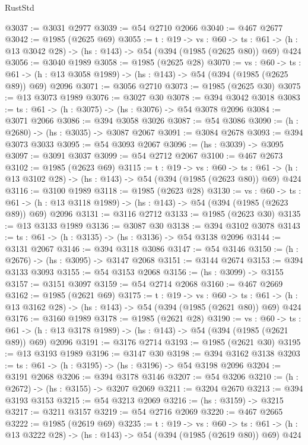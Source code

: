 \begin{lexlean}{RustStd}
\begin{coremodule}
{\begin{coremodule}
{{{{{{{{@3037 := @3031 @2977
@3039 := @54 @2710 @2066
@3040 := @467 @2677
@3042 := @1985 (@2625 @69)
@3055 := {t : @19} ->
  {vs : @60} ->
  {ts : @61} -> (h : @13 @3042 @28) -> (hs : @143) -> @54 (@394 (@1985 (@2625 @80)) @69) @424
@3056 := @3040 @1989
@3058 := @1985 (@2625 @28)
@3070 := {vs : @60} ->
  {ts : @61} -> (h : @13 @3058 @1989) -> (hs : @143) -> @54 (@394 (@1985 (@2625 @89)) @69) @2096
@3071 := @3056 @2710
@3073 := @1985 (@2625 @30)
@3075 := @13 @3073 @1989
@3076 := @3027 @30
@3078 := @394 @3042 @3018
@3083 := {ts : @61} -> (h : @3075) -> (hs : @3076) -> @54 @3078 @2096
@3084 := @3071 @2066
@3086 := @394 @3058 @3026
@3087 := @54 @3086
@3090 := (h : @2680) -> (hs : @3035) -> @3087 @2067
@3091 := @3084 @2678
@3093 := @394 @3073 @3033
@3095 := @54 @3093 @2067
@3096 := (hs : @3039) -> @3095
@3097 := @3091 @3037
@3099 := @54 @2712 @2067
@3100 := @467 @2673
@3102 := @1985 (@2623 @69)
@3115 := {t : @19} ->
  {vs : @60} ->
  {ts : @61} -> (h : @13 @3102 @28) -> (hs : @143) -> @54 (@394 (@1985 (@2623 @80)) @69) @424
@3116 := @3100 @1989
@3118 := @1985 (@2623 @28)
@3130 := {vs : @60} ->
  {ts : @61} -> (h : @13 @3118 @1989) -> (hs : @143) -> @54 (@394 (@1985 (@2623 @89)) @69) @2096
@3131 := @3116 @2712
@3133 := @1985 (@2623 @30)
@3135 := @13 @3133 @1989
@3136 := @3087 @30
@3138 := @394 @3102 @3078
@3143 := {ts : @61} -> (h : @3135) -> (hs : @3136) -> @54 @3138 @2096
@3144 := @3131 @2067
@3146 := @394 @3118 @3086
@3147 := @54 @3146
@3150 := (h : @2676) -> (hs : @3095) -> @3147 @2068
@3151 := @3144 @2674
@3153 := @394 @3133 @3093
@3155 := @54 @3153 @2068
@3156 := (hs : @3099) -> @3155
@3157 := @3151 @3097
@3159 := @54 @2714 @2068
@3160 := @467 @2669
@3162 := @1985 (@2621 @69)
@3175 := {t : @19} ->
  {vs : @60} ->
  {ts : @61} -> (h : @13 @3162 @28) -> (hs : @143) -> @54 (@394 (@1985 (@2621 @80)) @69) @424
@3176 := @3160 @1989
@3178 := @1985 (@2621 @28)
@3190 := {vs : @60} ->
  {ts : @61} -> (h : @13 @3178 @1989) -> (hs : @143) -> @54 (@394 (@1985 (@2621 @89)) @69) @2096
@3191 := @3176 @2714
@3193 := @1985 (@2621 @30)
@3195 := @13 @3193 @1989
@3196 := @3147 @30
@3198 := @394 @3162 @3138
@3203 := {ts : @61} -> (h : @3195) -> (hs : @3196) -> @54 @3198 @2096
@3204 := @3191 @2068
@3206 := @394 @3178 @3146
@3207 := @54 @3206
@3210 := (h : @2672) -> (hs : @3155) -> @3207 @2069
@3211 := @3204 @2670
@3213 := @394 @3193 @3153
@3215 := @54 @3213 @2069
@3216 := (hs : @3159) -> @3215
@3217 := @3211 @3157
@3219 := @54 @2716 @2069
@3220 := @467 @2665
@3222 := @1985 (@2619 @69)
@3235 := {t : @19} ->
  {vs : @60} ->
  {ts : @61} -> (h : @13 @3222 @28) -> (hs : @143) -> @54 (@394 (@1985 (@2619 @80)) @69) @424
}}}}}}}}
\end{coremodule}}
\end{coremodule}
\end{lexlean}
